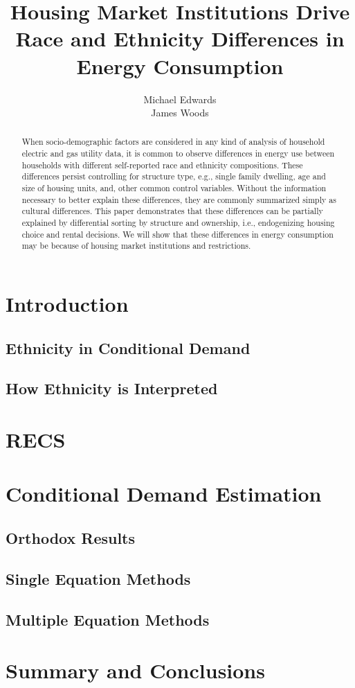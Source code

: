 \documentclass{article}
\author{Michael Edwards\\ 
  James Woods}
\title{Housing Market Institutions Drive Race and Ethnicity Differences in Energy Consumption}
\begin{document}
\maketitle


\begin{abstract}

When socio-demographic factors are considered in any kind of analysis of household electric and gas utility data, it is common to observe differences in energy use between households with different self-reported race and ethnicity compositions. These differences persist controlling for structure type, e.g., single family dwelling, age and size of housing units, and, other common control variables. Without the information necessary to better explain these differences, they are commonly summarized simply as cultural differences. This paper demonstrates that these differences can be partially explained by differential sorting by structure and ownership, i.e., endogenizing housing choice and rental decisions. We will show that these differences in energy consumption may be because of housing market institutions and restrictions.
\end{abstract}

\section{Introduction}

  \subsection{Ethnicity in Conditional Demand}
  \subsection{How Ethnicity is Interpreted}

\section{RECS}

\section{Conditional Demand Estimation}

  \subsection{Orthodox Results}
  \subsection{Single Equation Methods}
  \subsection{Multiple Equation Methods}
  
\section{Summary and Conclusions}

\nocite{*}


\end{document}

